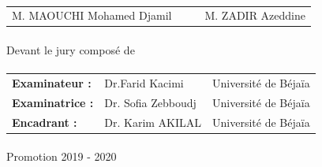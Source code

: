 \begin{titlepage}
\begin{center}
        \paragraph{}
        \begin{tabular}{l l l l}	
            M. MAOUCHI Mohamed Djamil & & & M. ZADIR Azeddine \\
        \end{tabular}
        \paragraph{}
        \large Devant le jury composé de
    \end{center}

    \paragraph{}

    \begin{table}[h!]
        \begin{center}
            \begin{tabular}{l l l}

                \textbf{Examinateur :} & Dr.Farid Kacimi &  Université de Béjaïa \\

                \textbf{Examinatrice :} & Dr. Sofia Zebboudj & Université de Béjaïa \\

                \textbf{Encadrant :} & Dr. Karim AKILAL & Université de Béjaïa \\

            \end{tabular}    
        \end{center}

    \end{table}

    \paragraph{}

    \begin{center} Promotion 2019 - 2020 \end{center}


\end{titlepage}

